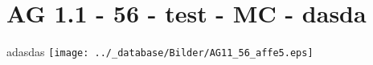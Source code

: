 \section{AG 1.1 - 56 - test - MC - dasda}

\begin{beispiel}[AG 1.1]{1}
adasdas \texttt{[image: ../\_database/Bilder/AG11\_56\_affe5.eps]}
\end{beispiel}